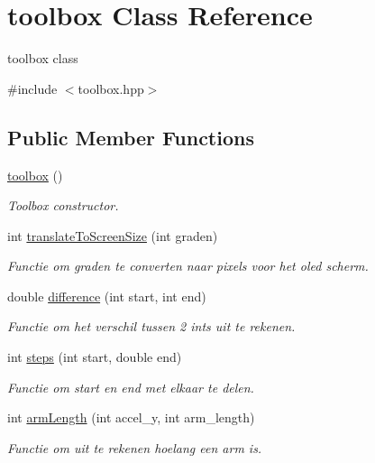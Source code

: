 \hypertarget{classtoolbox}{}\section{toolbox Class Reference}
\label{classtoolbox}


toolbox class  




{\ttfamily \#include $<$toolbox.\+hpp$>$}

\subsection*{Public Member Functions}
\begin{DoxyCompactItemize}
\item 
\hyperlink{classtoolbox_ae52c33dc9f80c6ce0208a70abde2418e}{toolbox} ()
\begin{DoxyCompactList}\small\item\em Toolbox constructor. \end{DoxyCompactList}\item 
int \hyperlink{classtoolbox_a59244902aefc121a12afec6baa8e1e87}{translate\+To\+Screen\+Size} (int graden)
\begin{DoxyCompactList}\small\item\em Functie om graden te converten naar pixels voor het oled scherm. \end{DoxyCompactList}\item 
double \hyperlink{classtoolbox_a99cefed812481a44f45bd795d1c4c1f2}{difference} (int start, int end)
\begin{DoxyCompactList}\small\item\em Functie om het verschil tussen 2 ints uit te rekenen. \end{DoxyCompactList}\item 
int \hyperlink{classtoolbox_a4917b28e63e41f052b25297e4d77f2b9}{steps} (int start, double end)
\begin{DoxyCompactList}\small\item\em Functie om start en end met elkaar te delen. \end{DoxyCompactList}\item 
int \hyperlink{classtoolbox_a9a2412a49c1268f8413c1fb580edc042}{arm\+Length} (int accel\+\_\+y, int arm\+\_\+length)
\begin{DoxyCompactList}\small\item\em Functie om uit te rekenen hoelang een arm is. \end{DoxyCompactList}\end{DoxyCompactItemize}


